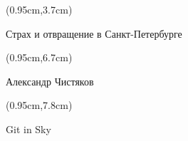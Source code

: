 \documentclass[xetex,18pt,aspectratio=43]{beamer}
\title[Страх и отвращение в Санкт-Петербурге]{}
\author[Александр Чистяков, Git in Sky]{}
\date{}
\newcommand\Bigfont{\fontsize{22}{22}\selectfont}
\newcommand\Authorfont{\fontsize{17}{17}\selectfont}
\newcommand\Orgfont{\fontsize{13}{13}\selectfont}
\begin{document}
{ %
    \begin{frame}[plain]
      \begin{textblock*}{\framewidth}(0.95cm,3.7cm) %
        \Bigfont
          \begin{center}
          Страх и отвращение в Санкт-Петербурге
          \end{center}
      \end{textblock*}
      \begin{textblock*}{\framewidth}(0.95cm,6.7cm) %
        \Authorfont
          \begin{center}
          Александр Чистяков
          \end{center}
      \end{textblock*}
      \begin{textblock*}{\framewidth}(0.95cm,7.8cm) %
        \Orgfont
          \begin{center}
          Git in Sky
          \end{center}
      \end{textblock*}
     \end{frame}
}
\end{document}
